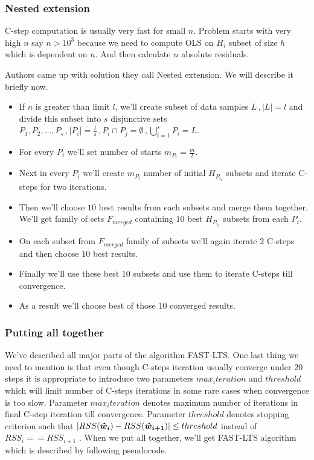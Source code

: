 \subsubsection{Nested extension}
C-step computation is usually very fast for small $n$. Problem starts with very high $n$ say $n > 10^3$ because we need to compute OLS on $H_i$ subset of size $h$ which is dependent on $n$. And then calculate $n$ absolute residuals.

Authors came up with solution they call Nested extension. We will describe it briefly now.
\begin{itemize}
	\item If $n$ is greater than limit $l$, we'll create subset of data samples $L\,, |L| = l$ and divide this subset into $s$ disjunctive sets $P_1,P_2,\ldots,P_s\,, |P_i| = \frac{l}{s}\,, P_i\cap P_j  = \emptyset\,, \bigcup_{i=1}^{s} P_{i} = L$.
	\item For every $P_i$ we'll set number of starts $m_{P_i} = \frac{m}{l}$. 
	\item Next in every $P_i$ we'll create $m_{P_i}$ number of initial $H_{P_{i_1}}$ subsets and iterate C-steps for two iterations.
	\item Then we'll choose $10$ best results from each subsets and merge them together. We'll get family of sets
	$F_{merged}$ containing $10$ best $H_{P_{i_3}}$ subsets from each $P_i$.
	\item On each subset from  $F_{merged}$ family of subsets we'll again iterate $2$ C-steps and then choose $10$ best results.
	\item Finally we'll use these best $10$ subsets and use them to iterate C-steps till convergence.
	\item As a result we'll choose best of those $10$ converged results.
\end{itemize} 

\subsubsection{Putting all together}
We've described all major parts of the algorithm FAST-LTS. One last thing we need to mention is that even though C-steps iteration usually converge under $20$ steps it is appropriate to introduce two parameters $max_iteration$ and $threshold$ which will limit number of C-steps iterations in some rare cases when convergence is too slow. Parameter $max_iteration$ denotes maximum number of iterations in final C-step iteration till convergence. Parameter $threshold$ denotes stopping criterion such that $| RSS(\boldsymbol{\hat{w}_{i}}) - RSS(\boldsymbol{\hat{w}_{i+1}})| \leq threshold$ instead of 
$RSS_{i} == RSS_{i+1}$ . When we put all together, we'll get FAST-LTS algorithm which is described by following pseudocode.


